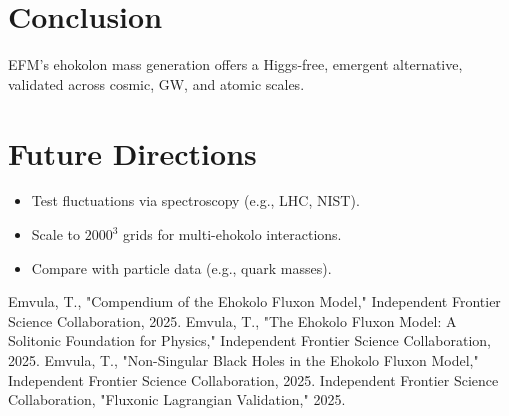 \documentclass{article}
\begin{document}
\section{Conclusion}
EFM’s ehokolon mass generation offers a Higgs-free, emergent alternative, validated across cosmic, GW, and atomic scales.

\section{Future Directions}
\begin{itemize}
    \item Test fluctuations via spectroscopy (e.g., LHC, NIST).
    \item Scale to $2000^3$ grids for multi-ehokolo interactions.
    \item Compare with particle data (e.g., quark masses).
\end{itemize}

\begin{thebibliography}{3}
 Emvula, T., "Compendium of the Ehokolo Fluxon Model," Independent Frontier Science Collaboration, 2025.
 Emvula, T., "The Ehokolo Fluxon Model: A Solitonic Foundation for Physics," Independent Frontier Science Collaboration, 2025.
 Emvula, T., "Non-Singular Black Holes in the Ehokolo Fluxon Model," Independent Frontier Science Collaboration, 2025.
 Independent Frontier Science Collaboration, "Fluxonic Lagrangian Validation," 2025.
\end{thebibliography}
\end{document}
